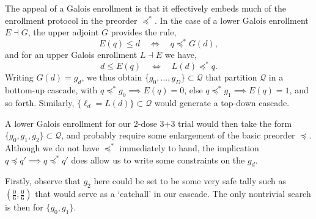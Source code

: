 \documentclass{article}
\newcommand{\Q}{\ensuremath{\mathcal{Q}}}
\newcommand{\preceqx}{\ensuremath{\preceq^*\!}}
\begin{document}
The appeal of a Galois enrollment is that it effectively embeds much of the enrollment protocol in the preorder $\preceqx$.  In the case of a lower Galois enrollment $E \dashv G$, the upper adjoint $G$ provides the rule,
$$
E(q) \leq d \quad \iff \quad q \preceqx G(d),
$$
and for an upper Galois enrollment $L \dashv E$ we have,
$$
d \leq E(q) \quad \iff \quad L(d) \preceqx q.
$$
Writing $G(d) = g_d$, we thus obtain $\{g_0,...,g_D\} \subset \Q$ that partition $\Q$ in a bottom-up cascade, with $q \preceqx g_0 \implies E(q)=0$, else $q \preceqx g_1 \implies E(q)=1$, and so forth.  Similarly, $\{\ell_d = L(d)\} \subset \Q$ would generate a top-down cascade.

\newpage
A lower Galois enrollment for our 2-dose \mbox{3+3} trial would then take the form $\{g_0, g_1, g_2\} \subset \Q$, and probably require some enlargement of the basic preorder $\preceq$.  Although we do not have $\preceqx$ immediately to hand, the implication $q \preceq q' \implies q \preceqx q'$ does allow us to write some constraints on the $g_d$.

Firstly, observe that $g_2$ here could be set to be some very safe tally such as $(\frac{0}{6},\frac{0}{6})$ that would serve as a `catchall' in our cascade.  The only nontrivial search is then for $\{g_0, g_1\}$.



\end{document}
